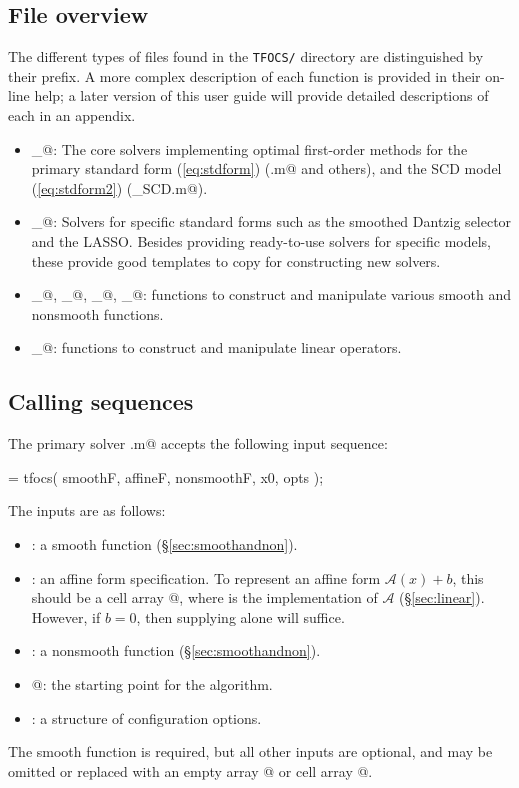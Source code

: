 \documentclass{article}
\newcommand{\cA}{\ensuremath{\mathcal{A}}}    %
\newcommand{\<}{\langle}
\renewcommand{\>}{\rangle}
\begin{document}
\subsection{File overview}

The different types of files found in the \verb+TFOCS/+ directory are
distinguished by their prefix. A more complex description of each 
function is provided in their on-line help; a later version of this
user guide will provide detailed descriptions of each in an appendix.
\begin{itemize}
\item \verb@tfocs_@: The core solvers implementing optimal first-order
methods for the primary standard form (\ref{eq:stdform}) (\verb@tfocs.m@ and others),
and the SCD model (\ref{eq:stdform2}) (\verb@tfocs_SCD.m@).
\item \verb@solver_@: Solvers for specific standard forms such as the
smoothed Dantzig selector and the LASSO. Besides providing
ready-to-use solvers for specific models, these provide good templates
to copy for constructing new solvers.
\item \verb@smooth_@, \verb@prox_@, \verb@proj_@, \verb@tfunc_@: functions to construct
and manipulate various smooth and nonsmooth functions.
\item \verb@linop_@: functions to construct and manipulate linear operators.
\end{itemize}

\subsection{Calling sequences}

The primary solver \verb@tfocs.m@ accepts the following input sequence:
\begin{code}
	[ x, out ] = tfocs( smoothF, affineF, nonsmoothF, x0, opts );
\end{code}
The inputs are as follows:
\begin{itemize}
\item \verb@smoothF@: a smooth function (\S\ref{sec:smoothandnon}).
\item \verb@affineF@: an affine form specification. To represent an
affine form $\cA(x)+b$, this should be a cell array 
@, where \verb@linearF@ is the implementation
of $\cA$  (\S\ref{sec:linear}). However, if $b=0$, then supplying
\verb@linearF@ alone will suffice.
\item \verb@nonsmoothF@: a nonsmooth function
(\S\ref{sec:smoothandnon}).
\item {}@: the starting point for the algorithm.
\item \verb@opts@: a structure of configuration options.
\end{itemize}
The smooth function is required, but all other inputs are optional,
and may be omitted or replaced with
an empty array \verb@[]@ or cell array \verb@{}@.
\end{document}
